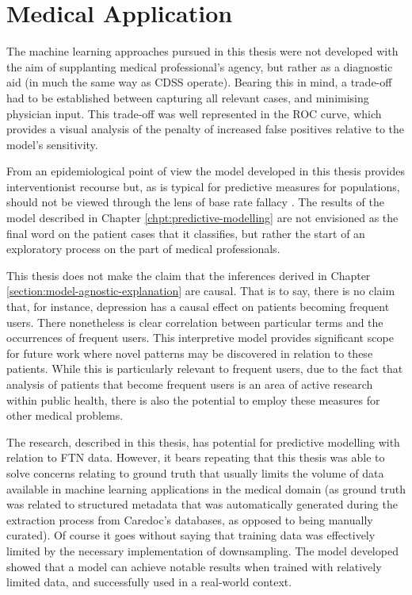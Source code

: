 \section{Medical Application}

The machine learning approaches pursued in this thesis were not developed with the aim of supplanting medical professional's agency, but rather as a diagnostic aid (in much the same way as CDSS operate). Bearing this in mind, a trade-off had to be established between capturing all relevant cases, and minimising physician input. This trade-off was well represented in the ROC curve, which provides a visual analysis \cite{alpaydin2014introduction} of  the penalty of increased false positives relative to the model's sensitivity.

From an epidemiological point of view the model developed in this thesis provides interventionist recourse but, as is typical for predictive measures for populations, should not be viewed through the lens of base rate fallacy \cite{welsh2012seeing}. The results of the model described in Chapter \ref{chpt:predictive-modelling} are not envisioned as the final word on the patient cases that it classifies, but rather the start of an exploratory process on the part of medical professionals. 

This thesis does not make the claim that the inferences derived in Chapter \ref{section:model-agnostic-explanation} are causal. That is to say, there is no claim that, for instance, depression has a causal effect on patients becoming frequent users. There nonetheless is clear correlation between particular terms and the occurrences of frequent users. This interpretive model provides significant scope for future work where novel patterns may be discovered in  relation to these patients. While this is particularly relevant to frequent users, due to the fact that analysis of patients that become frequent users is an area of active research within public health, there is also the potential to employ these measures for other medical problems.

The research, described in this thesis, has potential for predictive modelling with relation to FTN data. However, it bears repeating that this thesis was able to solve concerns relating to ground truth that usually limits the volume of data available in machine learning applications in the medical domain (as ground truth was related to structured metadata that was automatically generated during the extraction process from Caredoc's databases, as opposed to being manually curated). Of course it goes without saying that training data was effectively limited by the necessary implementation of downsampling. The model developed showed that a model can achieve notable results when trained with relatively limited data, and successfully used in a real-world context. 



